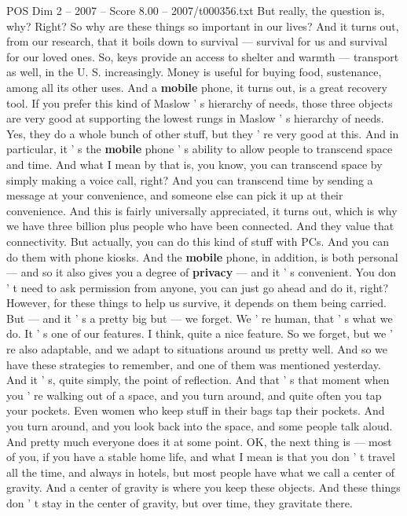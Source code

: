 \begin{textsample}{POS Dim 2 – 2007 – Score 8.00 – 2007/t000356.txt}
But really, the question is, why?
Right?
So why are these things so important in our lives?
And it turns out, from our research, that it boils down to survival — survival for us and survival for our loved ones.
So, keys provide an access to shelter and warmth — transport as well, in the U.
S. increasingly.
Money is useful for buying food, sustenance, among all its other uses.
And a \textbf{mobile} phone, it turns out, is a great recovery tool.
If you prefer this kind of Maslow ' s hierarchy of needs, those three objects are very good at supporting the lowest rungs in Maslow ' s hierarchy of needs.
Yes, they do a whole bunch of other stuff, but they ' re very good at this.
And in particular, it ' s the \textbf{mobile} phone ' s ability to allow people to transcend space and time.
And what I mean by that is, you know, you can transcend space by simply making a voice call, right?
And you can transcend time by sending a message at your convenience, and someone else can pick it up at their convenience.
And this is fairly universally appreciated, it turns out, which is why we have three billion plus people who have been connected.
And they value that connectivity.
But actually, you can do this kind of stuff with PCs.
And you can do them with phone kiosks.
And the \textbf{mobile} phone, in addition, is both personal — and so it also gives you a degree of \textbf{privacy} — and it ' s convenient.
You don ' t need to ask permission from anyone, you can just go ahead and do it, right?
However, for these things to help us survive, it depends on them being carried.
But — and it ' s a pretty big but — we forget.
We ' re human, that ' s what we do.
It ' s one of our features.
I think, quite a nice feature.
So we forget, but we ' re also adaptable, and we adapt to situations around us pretty well.
And so we have these strategies to remember, and one of them was mentioned yesterday.
And it ' s, quite simply, the point of reflection.
And that ' s that moment when you ' re walking out of a space, and you turn around, and quite often you tap your pockets.
Even women who keep stuff in their bags tap their pockets.
And you turn around, and you look back into the space, and some people talk aloud.
And pretty much everyone does it at some point.
OK, the next thing is — most of you, if you have a stable home life, and what I mean is that you don ' t travel all the time, and always in hotels, but most people have what we call a center of gravity.
And a center of gravity is where you keep these objects.
And these things don ' t stay in the center of gravity, but over time, they gravitate there.

\end{textsample}
